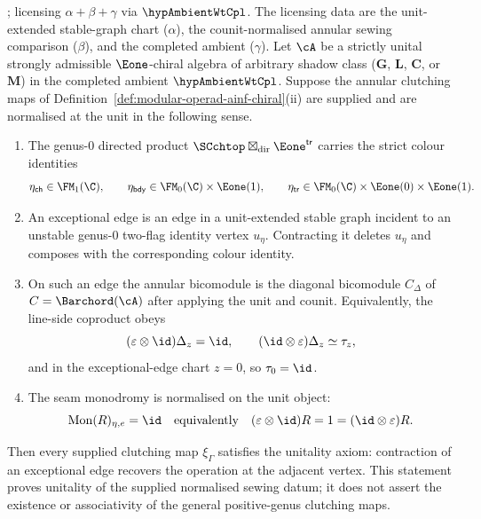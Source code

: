 \begin{proposition}
\ClaimStatusProvedHere; licensing $\alpha+\beta+\gamma$ via
\(\hypAmbientWtCpl\).
\label{prop:modular-operad-unitality}
\noindent The licensing data are the unit-extended stable-graph chart
\textup{(}$\alpha$\textup{)}, the counit-normalised annular sewing
comparison \textup{(}$\beta$\textup{)}, and the completed ambient
\textup{(}$\gamma$\textup{)}.
Let $\cA$ be a strictly unital strongly admissible $\Eone$-chiral
algebra of arbitrary shadow class
\textup{(}$\mathbf{G}$, $\mathbf{L}$, $\mathbf{C}$, or~$\mathbf{M}$\textup{)}
in the completed ambient \(\hypAmbientWtCpl\).  Suppose the annular
clutching maps of
Definition~\textup{\ref{def:modular-operad-ainf-chiral}(ii)}
are supplied and are normalised at the unit in the following sense.
\begin{enumerate}[label=\textup{(\roman*)}]
\item The genus-$0$ directed product
 \(\SCchtop\boxtimes_{\mathrm{dir}}\Eone^{\mathsf{tr}}\) carries the
 strict colour identities
 \[
  \eta_{\mathsf{ch}}\in\FM_1(\C),\qquad
  \eta_{\mathsf{bdy}}\in\FM_0(\C)\times\Eone(1),\qquad
  \eta_{\mathsf{tr}}\in\FM_0(\C)\times\Eone(0)\times\Eone(1).
 \]
\item An exceptional edge is an edge in a unit-extended stable graph
 incident to an unstable genus-$0$ two-flag identity vertex
 \(u_\eta\).  Contracting it deletes \(u_\eta\) and composes with the
 corresponding colour identity.
\item On such an edge the annular bicomodule is the diagonal
 bicomodule \(C_\Delta\) of \(C=\Barchord(\cA)\) after applying the
 unit and counit.  Equivalently, the line-side coproduct obeys
 \[
  (\varepsilon\otimes\id)\Delta_z=\id,\qquad
  (\id\otimes\varepsilon)\Delta_z\simeq\tau_z,
 \]
 and in the exceptional-edge chart \(z=0\), so \(\tau_0=\id\).
\item The seam monodromy is normalised on the unit object:
 \[
  \mathrm{Mon}(R)_{\eta,e}=\id
  \quad
  \textup{equivalently}\quad
  (\varepsilon\otimes\id)R=1=(\id\otimes\varepsilon)R .
 \]
\end{enumerate}
Then every supplied clutching map \(\xi_\Gamma\) satisfies the
unitality axiom: contraction of an exceptional edge recovers the
operation at the adjacent vertex.  This statement proves unitality of
the supplied normalised sewing datum; it does not assert the existence
or associativity of the general positive-genus clutching maps.
\end{proposition}

